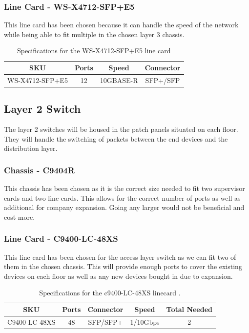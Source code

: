 \subsubsection{Line Card - WS-X4712-SFP+E5}
This line card has been chosen because it can handle the speed of the network while being able to fit multiple in the chosen layer 3 chassis.
\begin{table}[H]
    \centering
    \begin{tabular}{|cccc|}
    \hline
    \multicolumn{1}{|c|}{SKU} & \multicolumn{1}{c|}{Ports} & \multicolumn{1}{c|}{Speed} & Connector \\ \hline
    WS-X4712-SFP+E5           & 12                         & 10GBASE-R                  & SFP+/SFP  \\ \hline
    \end{tabular}
    \caption{Specifications for the WS-X4712-SFP+E5 line card \parencite{layer3-lc-datasheet}}
\end{table}
\subsection{Layer 2 Switch}
The layer 2 switches will be housed in the patch panels situated on each floor. They will handle the switching of packets between the end devices and the distribution layer.
\subsubsection{Chassis - C9404R}
This chassis has been chosen as it is the correct size needed to fit two supervisor cards and two line cards. This allows for the correct number of ports as well as additional for company expansion. Going any larger would not be beneficial and cost more. 
\subsubsection{Line Card - C9400-LC-48XS}
This line card has been chosen for the access layer switch as we can fit two of them in the chosen chassis. This will provide enough ports to cover the existing devices on each floor as well as any new devices bought in due to expansion.
\begin{table}[H]
    \centering
    \begin{tabular}{|ccccc|}
    \hline
    \multicolumn{1}{|c|}{SKU} & \multicolumn{1}{c|}{Ports} & \multicolumn{1}{c|}{Connector} & \multicolumn{1}{c|}{Speed} & Total Needed \\ \hline
    C9400-LC-48XS             & 48                         & SFP/SFP+                       & 1/10Gbps                   & 2            \\ \hline
    \end{tabular}
    \caption{Specifications for the c9400-LC-48XS linecard \parencite{layer2-lc-datasheet}.}
\end{table}
